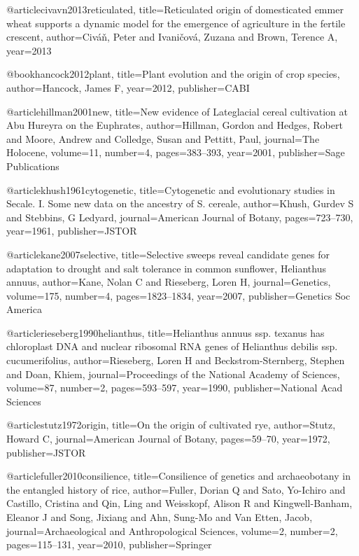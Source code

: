 {@article{civavn2013reticulated,
  title={Reticulated origin of domesticated emmer wheat supports a dynamic model for the emergence of agriculture in the fertile crescent},
  author={Civ{\'a}{\v{n}}, Peter and Ivani{\v{c}}ov{\'a}, Zuzana and Brown, Terence A},
  year={2013}
}

@book{hancock2012plant,
  title={Plant evolution and the origin of crop species},
  author={Hancock, James F},
  year={2012},
  publisher={CABI}
}

@article{hillman2001new,
  title={New evidence of Lateglacial cereal cultivation at Abu Hureyra on the Euphrates},
  author={Hillman, Gordon and Hedges, Robert and Moore, Andrew and Colledge, Susan and Pettitt, Paul},
  journal={The Holocene},
  volume={11},
  number={4},
  pages={383--393},
  year={2001},
  publisher={Sage Publications}
}

@article{khush1961cytogenetic,
  title={Cytogenetic and evolutionary studies in Secale. I. Some new data on the ancestry of S. cereale},
  author={Khush, Gurdev S and Stebbins, G Ledyard},
  journal={American Journal of Botany},
  pages={723--730},
  year={1961},
  publisher={JSTOR}
}

@article{kane2007selective,
  title={Selective sweeps reveal candidate genes for adaptation to drought and salt tolerance in common sunflower, Helianthus annuus},
  author={Kane, Nolan C and Rieseberg, Loren H},
  journal={Genetics},
  volume={175},
  number={4},
  pages={1823--1834},
  year={2007},
  publisher={Genetics Soc America}
}

@article{rieseberg1990helianthus,
  title={Helianthus annuus ssp. texanus has chloroplast DNA and nuclear ribosomal RNA genes of Helianthus debilis ssp. cucumerifolius},
  author={Rieseberg, Loren H and Beckstrom-Sternberg, Stephen and Doan, Khiem},
  journal={Proceedings of the National Academy of Sciences},
  volume={87},
  number={2},
  pages={593--597},
  year={1990},
  publisher={National Acad Sciences}
}

@article{stutz1972origin,
  title={On the origin of cultivated rye},
  author={Stutz, Howard C},
  journal={American Journal of Botany},
  pages={59--70},
  year={1972},
  publisher={JSTOR}
}

@article{fuller2010consilience,
  title={Consilience of genetics and archaeobotany in the entangled history of rice},
  author={Fuller, Dorian Q and Sato, Yo-Ichiro and Castillo, Cristina and Qin, Ling and Weisskopf, Alison R and Kingwell-Banham, Eleanor J and Song, Jixiang and Ahn, Sung-Mo and Van Etten, Jacob},
  journal={Archaeological and Anthropological Sciences},
  volume={2},
  number={2},
  pages={115--131},
  year={2010},
  publisher={Springer}
}

}
